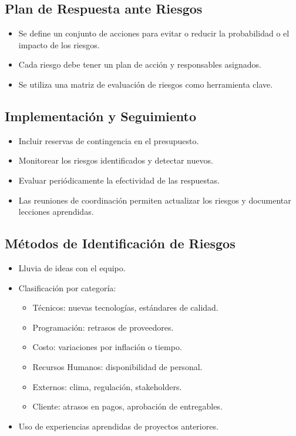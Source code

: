 \subsection*{Plan de Respuesta ante Riesgos}
\begin{itemize}
    \item Se define un conjunto de acciones para evitar o reducir la probabilidad o el impacto de los riesgos.
    \item Cada riesgo debe tener un plan de acción y responsables asignados.
    \item Se utiliza una matriz de evaluación de riesgos como herramienta clave.
\end{itemize}

\subsection*{Implementación y Seguimiento}
\begin{itemize}
    \item Incluir reservas de contingencia en el presupuesto.
    \item Monitorear los riesgos identificados y detectar nuevos.
    \item Evaluar periódicamente la efectividad de las respuestas.
    \item Las reuniones de coordinación permiten actualizar los riesgos y documentar lecciones aprendidas.
\end{itemize}

\subsection*{Métodos de Identificación de Riesgos}
\begin{itemize}
    \item Lluvia de ideas con el equipo.
    \item Clasificación por categoría:
    \begin{itemize}
        \item Técnicos: nuevas tecnologías, estándares de calidad.
        \item Programación: retrasos de proveedores.
        \item Costo: variaciones por inflación o tiempo.
        \item Recursos Humanos: disponibilidad de personal.
        \item Externos: clima, regulación, stakeholders.
        \item Cliente: atrasos en pagos, aprobación de entregables.
    \end{itemize}
    \item Uso de experiencias aprendidas de proyectos anteriores.
\end{itemize}

